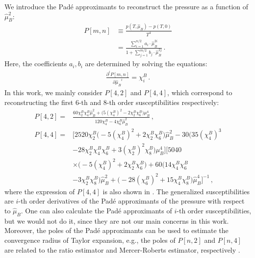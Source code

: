\documentclass[%
reprint,
superscriptaddress,
preprintnumbers,
amsmath,amssymb,
aps,
prd,
]{revtex4-2}
\begin{document}
We introduce the Pad\'e approximants to reconstruct the pressure as a function of $\hat\mu_B^2$:
\begin{align}
P[m,n]&\equiv \frac{p(T,\hat \mu_B)-p(T,0)}{T^4} \nonumber\\
&=\frac{\sum_{i=1}^{n/2} a_i\cdot \hat\mu_B^{2i}}{1+ \sum_{j=1}^{m/2} b_j \cdot \hat\mu_B^{2j}}\,.
\end{align}
Here, the coefficients $a_i,b_i$ are determined by solving the equations: 
\begin{align}
\frac{\partial^i P[m,n]}{{\partial \hat \mu_B} ^i}=\chi_i^B \, .
\end{align}
In this work, we mainly consider $P[4,2]$ and $P[4,4]$, which correspond to reconstructing the first $6$-th and $8$-th order susceptibilities respectively:
\begin{align}
P[4,2]=&\frac{60 \chi_2^B \chi_4^B \hat\mu_B^2 + \big(5 (\chi_4^B)^2  - 2 \chi_2^B \chi_6^B\big)\mu_B^4}{120 \chi_4^B - 4 \chi_6^B \hat\mu_B^2}\,\label{eq:PD42},\\[2ex]
P[4,4]=& \Big[2520 \chi_2^B \big(-5 (\chi_4^B)^2 + 2 \chi_2^B \chi_6^B\big) \hat\mu_B^2 - 30 \big(35 (\chi_4^B)^3\nonumber\\[1ex]
& - 28 \chi_2^B \chi_4^B \chi_6^B + 3 (\chi_2^B)^2 \chi_8^B\big) \mu_B^4\Big] \Big[5040 \nonumber \\[1ex]
&\times\big(-5 (\chi_4^B)^2 + 2 \chi_2^B \chi_6^B \big)  + 60 \big(14 \chi_4^B \chi_6^B \nonumber\\[1ex]
&- 3 \chi_2^B \chi_8^B\big) \hat\mu_B^2 + \big(-28 (\chi_6^B)^2 + 15 \chi_4^B \chi_8^B\big) \hat\mu_B^4\Big]^{-1}\,,\label{eq:PD44}
\end{align}
where the expression of $P[4,4]$ is also shown in \cite{Bollweg:2022rps}. The generalized susceptibilities are $i$-th order derivatives of the Pad\'e approximants of the pressure with respect to $\hat\mu_B$. One can also calculate the Pad\'e approximants of $i$-th order susceptibilities, but we would not do it, since they are not our main concerns in this work. Moreover, the poles of the Pad\'e approximants can be used to estimate the convergence radius of Taylor expansion, e.g., the poles of $P[n,2]$ and $P[n,4]$ are related to the ratio estimator and Mercer-Roberts estimator, respectively \cite{Bollweg:2022rps, Vovchenko:2017gkg}.
\end{document}
